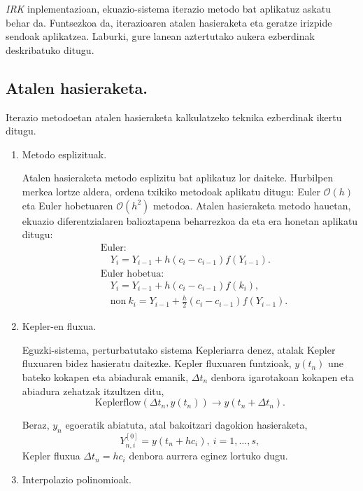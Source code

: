 \emph{IRK} inplementazioan, ekuazio-sistema iterazio metodo bat aplikatuz askatu behar da. Funtsezkoa da, iterazioaren atalen hasieraketa eta geratze irizpide sendoak aplikatzea. Laburki, gure lanean aztertutako aukera ezberdinak deskribatuko ditugu.  

\subsection*{Atalen hasieraketa.}

Iterazio metodoetan  atalen hasieraketa kalkulatzeko teknika ezberdinak ikertu ditugu. 
\begin{enumerate}
\item Metodo esplizituak.

Atalen hasieraketa metodo esplizitu bat aplikatuz lor daiteke. Hurbilpen merkea lortze aldera, ordena txikiko metodoak aplikatu ditugu: 
Euler  $\mathcal{O}(h)$ eta Euler hobetuaren $\mathcal{O}(h^2)$ metodoa. Atalen hasieraketa metodo hauetan, ekuazio diferentzialaren balioztapena beharrezkoa da eta era honetan aplikatu ditugu:
\begin{align*}
&\text{Euler}:\\
& \quad Y_i=Y_{i-1}+h (c_i-c_{i-1}) f(Y_{i-1}).\\
&\text{Euler hobetua}: \\
& \quad Y_i=Y_{i-1}+h (c_i-c_{i-1}) f(k_i),\\
& \quad \text{non} \ k_i=Y_{i-1}+\frac{h}{2} (c_i-c_{i-1}) f(Y_{i-1}).
\end{align*} 


\item Kepler-en fluxua.

Eguzki-sistema, perturbatutako sistema Kepleriarra denez, atalak Kepler fluxuaren bidez hasieratu daitezke. Kepler fluxuaren funtzioak, $y(t_n)$ une bateko kokapen eta abiadurak emanik, $\Delta t_n$ denbora igarotakoan kokapen eta abiadura zehatzak itzultzen ditu,
\begin{equation*}
\text{Keplerflow}(\Delta t_n, y(t_n)) \rightarrow y(t_n+\Delta t_n).
\end{equation*}

Beraz, $y_n$ egoeratik abiatuta, atal bakoitzari dagokion hasieraketa,
\begin{equation*}
Y_{n,i}^{[0]}=y(t_n+hc_i), \ i=1,\dots,s,
\end{equation*}
Kepler fluxua $\Delta t_n=hc_i$ denbora aurrera eginez lortuko dugu.  

\item Interpolazio polinomioak.


\end{enumerate}
